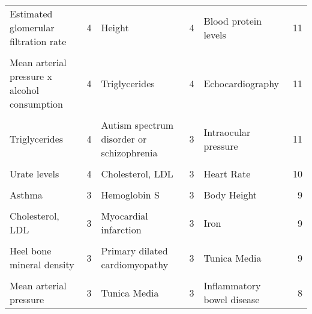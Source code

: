 \begin{landscape}
\begin{table}[!hp]
{\begin{tabular}[hp]{lrlrlr}
Estimated glomerular filtration rate & 4 & Height & 4 & Blood protein levels & 11\\
\cellcolor{gray!6}{Inflammatory bowel disease} & \cellcolor{gray!6}{4} & \cellcolor{gray!6}{Lipids} & \cellcolor{gray!6}{4} & \cellcolor{gray!6}{Cholesterol} & \cellcolor{gray!6}{11}\\
Mean arterial pressure x alcohol consumption & 4 & Triglycerides & 4 & Echocardiography & 11\\
\cellcolor{gray!6}{Response to alcohol consumption (flushing response)} & \cellcolor{gray!6}{4} & \cellcolor{gray!6}{Atrial fibrillation} & \cellcolor{gray!6}{3} & \cellcolor{gray!6}{Heel bone mineral density} & \cellcolor{gray!6}{11}\\
Triglycerides & 4 & Autism spectrum disorder or schizophrenia & 3 & Intraocular pressure & 11\\
\cellcolor{gray!6}{Type 2 diabetes} & \cellcolor{gray!6}{4} & \cellcolor{gray!6}{Cardiovascular phenotype} & \cellcolor{gray!6}{3} & \cellcolor{gray!6}{Waist circumference} & \cellcolor{gray!6}{11}\\
Urate levels & 4 & Cholesterol, LDL & 3 & Heart Rate & 10\\
\cellcolor{gray!6}{Alcohol dependence symptom count} & \cellcolor{gray!6}{3} & \cellcolor{gray!6}{Estimated glomerular filtration rate} & \cellcolor{gray!6}{3} & \cellcolor{gray!6}{Obesity-related traits} & \cellcolor{gray!6}{10}\\
Asthma & 3 & Hemoglobin S & 3 & Body Height & 9\\
\cellcolor{gray!6}{Body Weight} & \cellcolor{gray!6}{3} & \cellcolor{gray!6}{Long QT syndrome} & \cellcolor{gray!6}{3} & \cellcolor{gray!6}{Heart failure} & \cellcolor{gray!6}{9}\\
Cholesterol, LDL & 3 & Myocardial infarction & 3 & Iron & 9\\
\cellcolor{gray!6}{Coronary Artery Disease} & \cellcolor{gray!6}{3} & \cellcolor{gray!6}{Obesity-related traits} & \cellcolor{gray!6}{3} & \cellcolor{gray!6}{Schizophrenia} & \cellcolor{gray!6}{9}\\
Heel bone mineral density & 3 & Primary dilated cardiomyopathy & 3 & Tunica Media & 9\\
\cellcolor{gray!6}{Hip} & \cellcolor{gray!6}{3} & \cellcolor{gray!6}{Pulse pressure} & \cellcolor{gray!6}{3} & \cellcolor{gray!6}{Height} & \cellcolor{gray!6}{8}\\
Mean arterial pressure & 3 & Tunica Media & 3 & Inflammatory bowel disease & 8\\

\end{tabular}}
\end{table}
\end{landscape}
